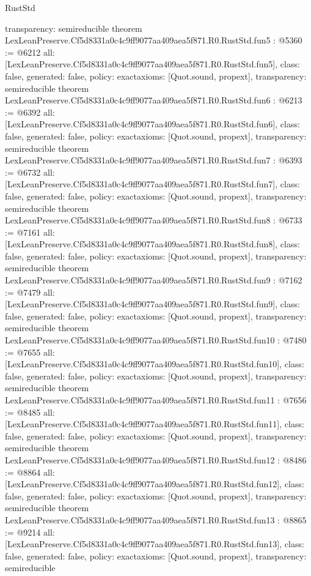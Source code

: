 \begin{lexlean}{RustStd}
\begin{coremodule}
{  transparency: semireducible
}
theorem LexLeanPreserve.Cf5d8331a0c4c9ff9077aa409aea5f871.R0.RustStd.fun5 : @5360 := @6212 {
  all: [LexLeanPreserve.Cf5d8331a0c4c9ff9077aa409aea5f871.R0.RustStd.fun5],
  class: false,
  generated: false,
  policy: exact{axioms: [Quot.sound, propext]},
  transparency: semireducible
}
theorem LexLeanPreserve.Cf5d8331a0c4c9ff9077aa409aea5f871.R0.RustStd.fun6 : @6213 := @6392 {
  all: [LexLeanPreserve.Cf5d8331a0c4c9ff9077aa409aea5f871.R0.RustStd.fun6],
  class: false,
  generated: false,
  policy: exact{axioms: [Quot.sound, propext]},
  transparency: semireducible
}
theorem LexLeanPreserve.Cf5d8331a0c4c9ff9077aa409aea5f871.R0.RustStd.fun7 : @6393 := @6732 {
  all: [LexLeanPreserve.Cf5d8331a0c4c9ff9077aa409aea5f871.R0.RustStd.fun7],
  class: false,
  generated: false,
  policy: exact{axioms: [Quot.sound, propext]},
  transparency: semireducible
}
theorem LexLeanPreserve.Cf5d8331a0c4c9ff9077aa409aea5f871.R0.RustStd.fun8 : @6733 := @7161 {
  all: [LexLeanPreserve.Cf5d8331a0c4c9ff9077aa409aea5f871.R0.RustStd.fun8],
  class: false,
  generated: false,
  policy: exact{axioms: [Quot.sound, propext]},
  transparency: semireducible
}
theorem LexLeanPreserve.Cf5d8331a0c4c9ff9077aa409aea5f871.R0.RustStd.fun9 : @7162 := @7479 {
  all: [LexLeanPreserve.Cf5d8331a0c4c9ff9077aa409aea5f871.R0.RustStd.fun9],
  class: false,
  generated: false,
  policy: exact{axioms: [Quot.sound, propext]},
  transparency: semireducible
}
theorem LexLeanPreserve.Cf5d8331a0c4c9ff9077aa409aea5f871.R0.RustStd.fun10 : @7480 := @7655 {
  all: [LexLeanPreserve.Cf5d8331a0c4c9ff9077aa409aea5f871.R0.RustStd.fun10],
  class: false,
  generated: false,
  policy: exact{axioms: [Quot.sound, propext]},
  transparency: semireducible
}
theorem LexLeanPreserve.Cf5d8331a0c4c9ff9077aa409aea5f871.R0.RustStd.fun11 : @7656 := @8485 {
  all: [LexLeanPreserve.Cf5d8331a0c4c9ff9077aa409aea5f871.R0.RustStd.fun11],
  class: false,
  generated: false,
  policy: exact{axioms: [Quot.sound, propext]},
  transparency: semireducible
}
theorem LexLeanPreserve.Cf5d8331a0c4c9ff9077aa409aea5f871.R0.RustStd.fun12 : @8486 := @8864 {
  all: [LexLeanPreserve.Cf5d8331a0c4c9ff9077aa409aea5f871.R0.RustStd.fun12],
  class: false,
  generated: false,
  policy: exact{axioms: [Quot.sound, propext]},
  transparency: semireducible
}
theorem LexLeanPreserve.Cf5d8331a0c4c9ff9077aa409aea5f871.R0.RustStd.fun13 : @8865 := @9214 {
  all: [LexLeanPreserve.Cf5d8331a0c4c9ff9077aa409aea5f871.R0.RustStd.fun13],
  class: false,
  generated: false,
  policy: exact{axioms: [Quot.sound, propext]},
  transparency: semireducible
}
\end{coremodule}
\end{lexlean}
